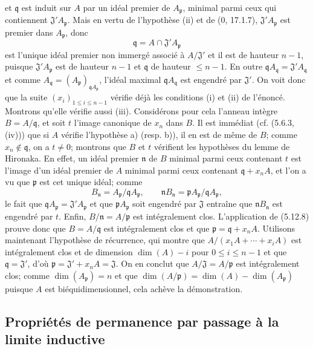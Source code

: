 et $\mathfrak q$ est induit sur $A$ par un idéal premier de
$A_{\mathfrak p}$, minimal parmi ceux qui contiennent
$\mathfrak J'A_{\mathfrak p}$. Mais en vertu de l'hypothèse (ii) et de (0,
17.1.7), $\mathfrak J'A_{\mathfrak p}$ est premier dans $A_{\mathfrak p}$,
donc
\[
\mathfrak q=A\cap\mathfrak J'A_{\mathfrak p}
\]
est l'unique idéal premier non immergé associé à $A/\mathfrak J'$ et il est de
hauteur $n-1$, puisque $\mathfrak J'A_{\mathfrak p}$ est de hauteur $n-1$ et
$\mathfrak q$ de hauteur $\leq n-1$. En outre
$\mathfrak qA_{\mathfrak q}=\mathfrak J'A_{\mathfrak q}$ et comme
$A_{\mathfrak q}=(A_{\mathfrak p})_{\mathfrak qA_{\mathfrak p}}$, l'idéal
maximal $\mathfrak qA_{\mathfrak q}$ est engendré par $\mathfrak J'$. On voit
donc que la suite $(x_i)_{1\leq i\leq n-1}$ vérifie déjà les conditions (i) et
(ii) de l'énoncé. Montrons qu'elle vérifie aussi (iii). Considérons pour cela
l'anneau intègre $B=A/\mathfrak q$, et soit $t$ l'image canonique de $x_n$ dans
$B$. Il est immédiat (cf. (5.6.3, (iv))) que si $A$ vérifie l'hypothèse a)
(resp. b)), il en est de même de $B$; comme $x_n\notin\mathfrak q$, on a
$t\neq0$; montrons que $B$ et $t$ vérifient les hypothèses du lemme de
Hironaka. En effet, un idéal premier $\mathfrak n$ de $B$ minimal parmi ceux
contenant $t$ est l'image d'un idéal premier de $A$ minimal parmi ceux
contenant $\mathfrak q+x_nA$, et l'on a vu que $\mathfrak p$ est cet unique
idéal; comme
\[
B_{\mathfrak n}=A_{\mathfrak p}/\mathfrak qA_{\mathfrak p},\qquad
\mathfrak nB_{\mathfrak n}
=\mathfrak pA_{\mathfrak p}/\mathfrak qA_{\mathfrak p},
\]
le fait que $\mathfrak qA_{\mathfrak p}=\mathfrak J'A_{\mathfrak p}$ et que
$\mathfrak pA_{\mathfrak p}$ soit engendré par $\mathfrak J$ entraîne que
$\mathfrak nB_{\mathfrak n}$ est engendré par $t$. Enfin,
$B/\mathfrak n=A/\mathfrak p$ est intégralement clos. L'application de
(5.12.8) prouve donc que $B=A/\mathfrak q$ est intégralement clos et que
$\mathfrak p=\mathfrak q+x_nA$. Utilisons maintenant l'hypothèse de récurrence,
qui montre que $A/(x_1A+\cdots+x_iA)$ est intégralement clos et de dimension
$\dim(A)-i$ pour $0\leq i\leq n-1$ et que $\mathfrak q=\mathfrak J'$, d'où
$\mathfrak p=\mathfrak J'+x_nA=\mathfrak J$. On en conclut que
$A/\mathfrak J=A/\mathfrak p$ est intégralement clos; comme
$\dim(A_{\mathfrak p})=n$ et que
$\dim(A/\mathfrak p)=\dim(A)-\dim(A_{\mathfrak p})$ puisque $A$ est
biéquidimensionnel, cela achève la démonstration.

\subsection{Propriétés de permanence par passage à la limite inductive}

